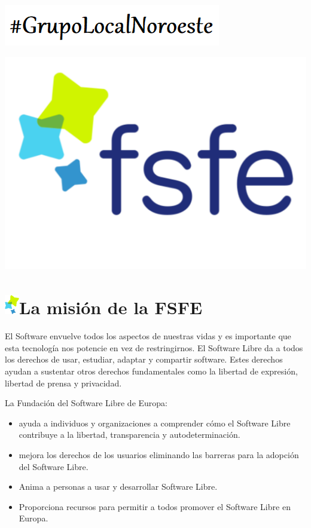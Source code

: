 \documentclass[10pt,foldmark,tumble]{leaflet}
\begin{document}
\begin{flushright}
\includegraphics[scale=0.8]{gFSFE.png}
\end{flushright}

\includegraphics[scale=0.20]{fsfe.pdf}

\section{\includegraphics{item.png}La misión de la FSFE}

El Software envuelve todos los aspectos de nuestras vidas y es importante que esta tecnología nos potencie en vez de restringirnos. El Software Libre da a todos los derechos de usar, estudiar, adaptar y compartir software. Estes derechos ayudan a sustentar otros derechos fundamentales como la libertad de expresión, libertad de prensa y privacidad.

La Fundación del Software Libre de Europa:
\begin{itemize}
\item ayuda a individuos y organizaciones a comprender cómo el Software Libre contribuye a la libertad, transparencia y autodeterminación.
\item mejora los derechos de los usuarios eliminando las barreras para la adopción del Software Libre.
\item Anima a personas a usar y desarrollar Software Libre.
\item Proporciona recursos para permitir a todos promover el Software Libre en Europa.
\end{itemize}
\end{document}

